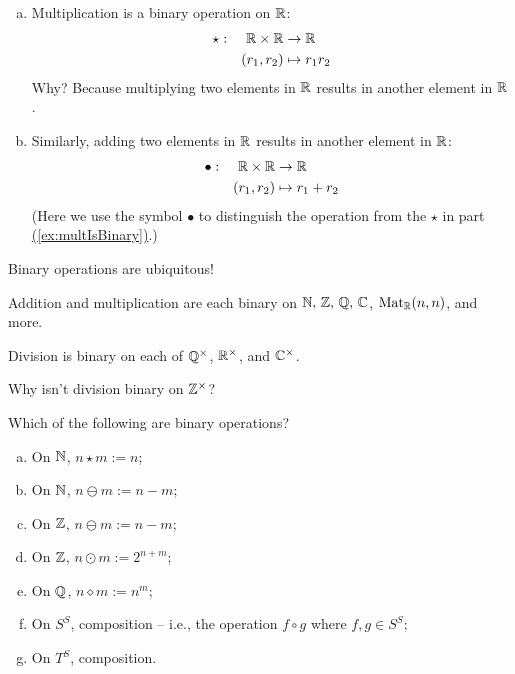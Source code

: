 \documentclass[../UNABRIDGEDalgebraNotesMSRI-UP2016.tex]{subfiles}
\begin{document}
\begin{frame}
\begin{ex}
\begin{enumerate}[(a)]
\item\label{ex:multIsBinary} Multiplication is a binary operation on $\mathbb R$:
\begin{alignat*}{3}
\star: && \mathbb R\times \mathbb R & \to \mathbb R \\
	&& (r_1,r_2) & \mapsto r_1r_2
\end{alignat*}
Why?  Because multiplying two elements in $\mathbb R$ results in another element in $\mathbb R$.
\item Similarly, adding two elements in $\mathbb R$ results in another element in $\mathbb R$: 
\begin{alignat*}{3}
\bullet: && \mathbb R\times \mathbb R & \to \mathbb R \\
	&& (r_1,r_2) & \mapsto r_1+r_2
\end{alignat*}  
(Here we use the symbol $\bullet$ to distinguish the operation from the $\star$ in part \hyperref[ex:multIsBinary]{(\ref{ex:multIsBinary})}.)
\end{enumerate}
\end{ex}
\end{frame}

\begin{frame}%
Binary operations are ubiquitous!

\smallGap
\begin{ex}
Addition and multiplication are each binary on $\mathbb N,\,\mathbb Z,\,\mathbb Q,\,\mathbb C$, $\operatorname{Mat}_{\mathbb R}(n,n)$, and more.  
\end{ex}

\smallGap
\begin{ex}
Division is binary on each of $\mathbb Q^{\times}$, $\mathbb R^{\times}$, and $\mathbb C^{\times}$.     
\end{ex}

\smallGap
\begin{que}
Why isn't division binary on $\mathbb Z^{\times}$?   
\end{que}
\end{frame}

\begin{frame}%
\begin{exe}[cf. Problem 39]\label{exe:binary}
Which of the following are binary operations?
\begin{enumerate}[(a)]
\item On $\mathbb N$, $n\star m:=n$;
\item On $\mathbb N$, $n\ominus m:=n-m$;
\item On $\mathbb Z$, $n\ominus m:=n-m$;
\item On $\mathbb Z$, $n\odot m:=2^{n+m}$;
\item On $\mathbb Q$, $n\diamond m :=n^m$;
\item On $S^S$, composition -- i.e., the operation $f\circ g$ where $f,g\in S^S$;
\item On $T^S$, composition.
\end{enumerate}
\end{exe}
\end{frame}
\end{document}

